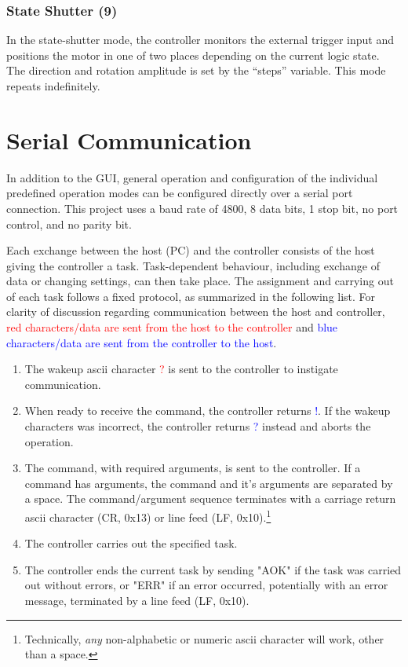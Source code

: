 \documentclass[10pt]{article}
\begin{document}
\subsubsection{State Shutter (9)}
In the state-shutter mode, the controller monitors the external trigger input and positions the motor in one of two places depending on the current logic state.  The direction and rotation amplitude is set by the ``steps'' variable.  This mode repeats indefinitely.  


\FloatBarrier
\newpage
\section{Serial Communication} 
\label{Serial_Communication}
In addition to the GUI, general operation and configuration of the individual predefined operation modes can be configured directly over a serial port connection.  This project uses a baud rate of 4800, 8 data bits, 1 stop bit, no port control, and no parity bit.

Each exchange between the host (PC) and the controller consists of the host giving the controller a task.  Task-dependent behaviour, including exchange of data or changing settings, can then take place.  The assignment and carrying out of each task follows a fixed protocol, as summarized in the following list. For clarity of discussion regarding communication between the host and controller, \textcolor{red}{red characters/data are sent from the host to the controller} and  \textcolor{blue}{blue characters/data are sent from the controller to the host}.   
  
\begin{enumerate}
\item{The wakeup ascii character \textcolor{red}{?} is sent to the controller to instigate communication.}
\item{When ready to receive the command, the controller returns \textcolor{blue}{!}.  If the wakeup characters was incorrect, the controller returns \textcolor{blue}{?} instead and aborts the operation.}
\item{The command, with required arguments, is sent to the controller.  If a command has arguments, the command and it's arguments are separated by a space.  The command/argument sequence terminates with a carriage return ascii character (CR, 0x13) or line feed (LF, 0x10).\footnote{Technically, \emph{any} non-alphabetic or numeric ascii character will work, other than a space.}}
\item{The controller carries out the specified task.}
\item{The controller ends the current task by sending "AOK" if the task was carried out without errors, or "ERR" if an error occurred, potentially with an error message, terminated by a line feed (LF, 0x10).}
\end{enumerate}
\end{document}
